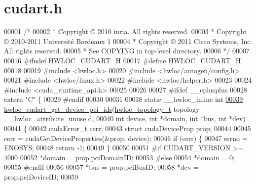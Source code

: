 \hypertarget{a00029_source}{
\section{cudart.h}
}

\begin{DoxyCode}
00001 \textcolor{comment}{/*}
00002 \textcolor{comment}{ * Copyright © 2010 inria.  All rights reserved.}
00003 \textcolor{comment}{ * Copyright © 2010-2011 Université Bordeaux 1}
00004 \textcolor{comment}{ * Copyright © 2011 Cisco Systems, Inc.  All rights reserved.}
00005 \textcolor{comment}{ * See COPYING in top-level directory.}
00006 \textcolor{comment}{ */}
00007 
00016 \textcolor{preprocessor}{#ifndef HWLOC\_CUDART\_H}
00017 \textcolor{preprocessor}{}\textcolor{preprocessor}{#define HWLOC\_CUDART\_H}
00018 \textcolor{preprocessor}{}
00019 \textcolor{preprocessor}{#include <hwloc.h>}
00020 \textcolor{preprocessor}{#include <hwloc/autogen/config.h>}
00021 \textcolor{preprocessor}{#include <hwloc/linux.h>}
00022 \textcolor{preprocessor}{#include <hwloc/helper.h>}
00023 
00024 \textcolor{preprocessor}{#include <cuda\_runtime\_api.h>}
00025 
00026 
00027 \textcolor{preprocessor}{#ifdef \_\_cplusplus}
00028 \textcolor{preprocessor}{}\textcolor{keyword}{extern} \textcolor{stringliteral}{"C"} \{
00029 \textcolor{preprocessor}{#endif}
00030 \textcolor{preprocessor}{}
00031 
00038 \textcolor{keyword}{static} \_\_hwloc\_inline \textcolor{keywordtype}{int}
\hypertarget{a00029_source_l00039}{}\hyperlink{a00072_ga1cbf127459986c345f873e2752ddf681}{00039} \hyperlink{a00072_ga1cbf127459986c345f873e2752ddf681}{hwloc_cudart_get_device_pci_ids}(\hyperlink{a00039_ga9d1e76ee15a7dee158b786c30b6a6e38}{hwloc_topology_t} topology \_\_hwloc\_attribute\_unuse
      d,
00040                                \textcolor{keywordtype}{int} device, \textcolor{keywordtype}{int} *domain, \textcolor{keywordtype}{int} *bus, \textcolor{keywordtype}{int} *dev)
00041 \{
00042   cudaError\_t cerr;
00043   \textcolor{keyword}{struct }cudaDeviceProp prop;
00044 
00045   cerr = cudaGetDeviceProperties(&prop, device);
00046   \textcolor{keywordflow}{if} (cerr) \{
00047     errno = ENOSYS;
00048     \textcolor{keywordflow}{return} -1;
00049   \}
00050 
00051 \textcolor{preprocessor}{#if CUDART\_VERSION >= 4000}
00052 \textcolor{preprocessor}{}  *domain = prop.pciDomainID;
00053 \textcolor{preprocessor}{#else}
00054 \textcolor{preprocessor}{}  *domain = 0;
00055 \textcolor{preprocessor}{#endif}
00056 \textcolor{preprocessor}{}
00057   *bus = prop.pciBusID;
00058   *dev = prop.pciDeviceID;
00059 

\end{DoxyCode}
